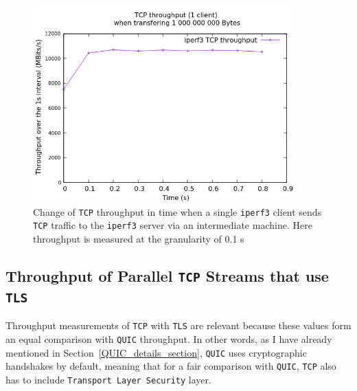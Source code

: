 \documentclass[12pt,a4paper]{report}
\newcommand\note[2]{{\color{#1}\bf #2}}
\newcommand\simon[1]{\ifcomments{\note{cyan}{SM: #1}}\fi}
\begin{document}
    \begin{figure}[H]
    \centering
    \includegraphics[width=0.9\textwidth]{figs/TCP_throughput_in_time.png}
    \caption[Change of \texttt{TCP} throughput in time when a single \texttt{iperf3} client sends \texttt{TCP} traffic to the \texttt{iperf3} server via an intermediate machine]{Change of \texttt{TCP} throughput in time when a single \texttt{iperf3} client sends \texttt{TCP} traffic to the \texttt{iperf3} server via an intermediate machine. Here throughput is measured at the granularity of 0.1 s}
    \label{fig:TCP_throughput_in_time}
    \end{figure}
    
    
    
    
    

\subsection{Throughput of Parallel \texttt{TCP} Streams that use \texttt{TLS}}
 
Throughput measurements of \texttt{TCP} with \texttt{TLS} are relevant because these values form an equal comparison with \texttt{QUIC} throughput.
In other words, as I have already mentioned in Section~\ref{QUIC_details_section}, \texttt{QUIC} uses cryptographic handshakes by default, meaning that for a fair comparison with \texttt{QUIC}, \texttt{TCP} also has to include \texttt{Transport Layer Security} layer.
\end{document}
